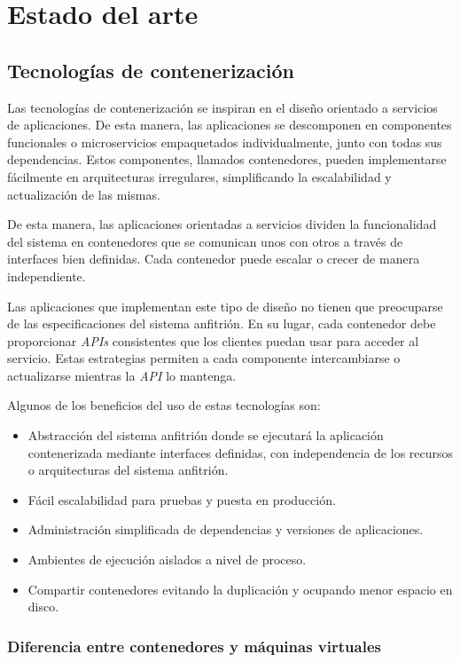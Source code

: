 \chapter{Estado del arte}
\label{cha:state_of_art}


\section{Tecnologías de contenerización}

Las tecnologías de contenerización se inspiran en el diseño orientado a servicios de aplicaciones. De esta manera, las aplicaciones se descomponen en componentes funcionales o microservicios empaquetados individualmente, junto con todas sus dependencias. Estos componentes, llamados contenedores, pueden implementarse fácilmente en arquitecturas irregulares, simplificando la escalabilidad y actualización de las mismas.

De esta manera, las aplicaciones orientadas a servicios dividen la funcionalidad del sistema en contenedores que se comunican unos con otros a través de interfaces bien definidas. Cada contenedor puede escalar o crecer de manera independiente.

Las aplicaciones que implementan este tipo de diseño no tienen que preocuparse de las especificaciones del sistema anfitrión. En su lugar, cada contenedor debe proporcionar \textit{APIs} consistentes que los clientes puedan usar para acceder al servicio. Estas estrategias permiten a cada componente intercambiarse o actualizarse mientras la \textit{API} lo mantenga.

Algunos de los beneficios del uso de estas tecnologías son:
\begin{itemize}
\item Abstracción del sistema anfitrión donde se ejecutará la aplicación contenerizada mediante interfaces definidas, con independencia de los recursos o arquitecturas del sistema anfitrión.
\item Fácil escalabilidad para pruebas y puesta en producción.
\item Administración simplificada de dependencias y versiones de aplicaciones.
\item Ambientes de ejecución aislados a nivel de proceso.
\item Compartir contenedores evitando la duplicación y ocupando menor espacio en disco.
\end{itemize}

\subsection{Diferencia entre contenedores y máquinas virtuales}

